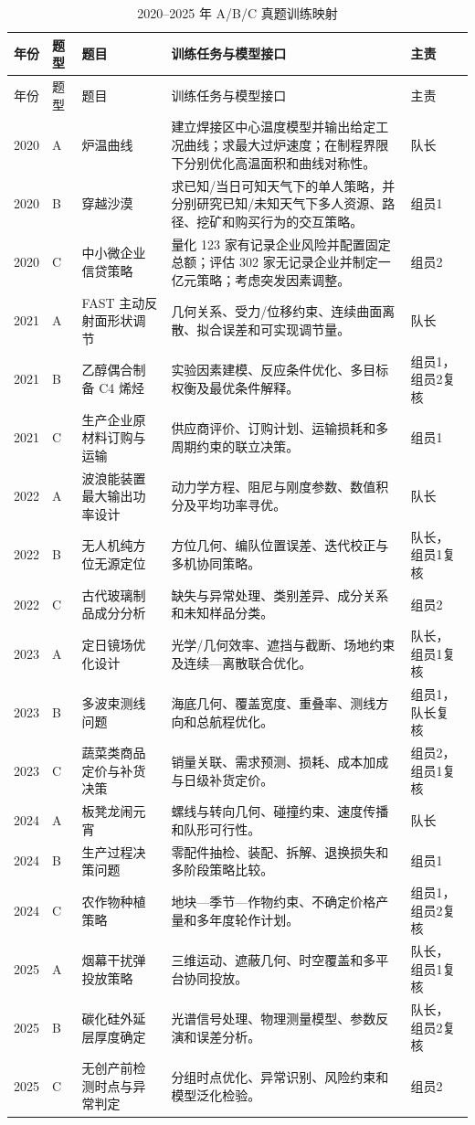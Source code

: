 \documentclass[UTF8,a4paper,12pt]{ctexart}
\begin{document}
\begin{longtable}{p{1.2cm}p{1.3cm}p{3.3cm}p{6.0cm}p{1.9cm}}
\caption{2020--2025 年 A/B/C 真题训练映射}\label{tab:problems}\\
\toprule
年份 & 题型 & 题目 & 训练任务与模型接口 & 主责\\
\midrule
\endfirsthead
\toprule
年份 & 题型 & 题目 & 训练任务与模型接口 & 主责\\
\midrule
\endhead
2020 & A & 炉温曲线 & 建立焊接区中心温度模型并输出给定工况曲线；求最大过炉速度；在制程界限下分别优化高温面积和曲线对称性。 & 队长\\
2020 & B & 穿越沙漠 & 求已知/当日可知天气下的单人策略，并分别研究已知/未知天气下多人资源、路径、挖矿和购买行为的交互策略。 & 组员1\\
2020 & C & 中小微企业信贷策略 & 量化 123 家有记录企业风险并配置固定总额；评估 302 家无记录企业并制定一亿元策略；考虑突发因素调整。 & 组员2\\
2021 & A & FAST 主动反射面形状调节 & 几何关系、受力/位移约束、连续曲面离散、拟合误差和可实现调节量。 & 队长\\
2021 & B & 乙醇偶合制备 C4 烯烃 & 实验因素建模、反应条件优化、多目标权衡及最优条件解释。 & 组员1，组员2复核\\
2021 & C & 生产企业原材料订购与运输 & 供应商评价、订购计划、运输损耗和多周期约束的联立决策。 & 组员1\\
2022 & A & 波浪能装置最大输出功率设计 & 动力学方程、阻尼与刚度参数、数值积分及平均功率寻优。 & 队长\\
2022 & B & 无人机纯方位无源定位 & 方位几何、编队位置误差、迭代校正与多机协同策略。 & 队长，组员1复核\\
2022 & C & 古代玻璃制品成分分析 & 缺失与异常处理、类别差异、成分关系和未知样品分类。 & 组员2\\
2023 & A & 定日镜场优化设计 & 光学/几何效率、遮挡与截断、场地约束及连续—离散联合优化。 & 队长，组员1复核\\
2023 & B & 多波束测线问题 & 海底几何、覆盖宽度、重叠率、测线方向和总航程优化。 & 组员1，队长复核\\
2023 & C & 蔬菜类商品定价与补货决策 & 销量关联、需求预测、损耗、成本加成与日级补货定价。 & 组员2，组员1复核\\
2024 & A & 板凳龙闹元宵 & 螺线与转向几何、碰撞约束、速度传播和队形可行性。 & 队长\\
2024 & B & 生产过程决策问题 & 零配件抽检、装配、拆解、退换损失和多阶段策略比较。 & 组员1\\
2024 & C & 农作物种植策略 & 地块—季节—作物约束、不确定价格产量和多年度轮作计划。 & 组员1，组员2复核\\
2025 & A & 烟幕干扰弹投放策略 & 三维运动、遮蔽几何、时空覆盖和多平台协同投放。 & 队长，组员1复核\\
2025 & B & 碳化硅外延层厚度确定 & 光谱信号处理、物理测量模型、参数反演和误差分析。 & 队长，组员2复核\\
2025 & C & 无创产前检测时点与异常判定 & 分组时点优化、异常识别、风险约束和模型泛化检验。 & 组员2\\
\bottomrule
\end{longtable}
\end{document}
